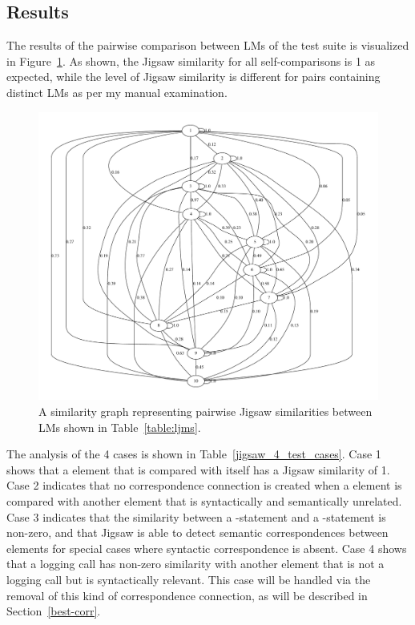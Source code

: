 \subsection{Results}  \label{study1-results}
The results of the pairwise comparison between LMs of the test suite is visualized in Figure~\ref{fig:jigsaw_graph}. As shown, the Jigsaw similarity for all self-comparisons is 1 as expected, while the level of Jigsaw similarity is different for pairs containing distinct LMs as per my manual examination.

\begin{figure}[t]
  \centering\includegraphics [width = \textwidth]{graphviz/jigsaw.pdf}
  \caption{A similarity graph representing pairwise Jigsaw similarities between LMs shown in Table~\ref{table:ljms}.}
  \label{fig:jigsaw_graph}
\end{figure}


The analysis of the 4 cases is shown in Table~\ref{jigsaw_4_test_cases}. Case 1 shows that a  element that is compared with itself has a Jigsaw similarity of 1. Case 2 indicates that no correspondence connection is created when a  element is compared with another  element that is syntactically and semantically unrelated. Case 3 indicates that the similarity between a -statement and a -statement is non-zero, and that Jigsaw is able to detect semantic correspondences between  elements for special cases where syntactic correspondence is absent. Case 4 shows that a logging call has non-zero similarity with another  element that is not a logging call but is syntactically relevant. This case will be handled via the removal of this kind of correspondence connection, as will be described in Section~\ref{best-corr}. %


